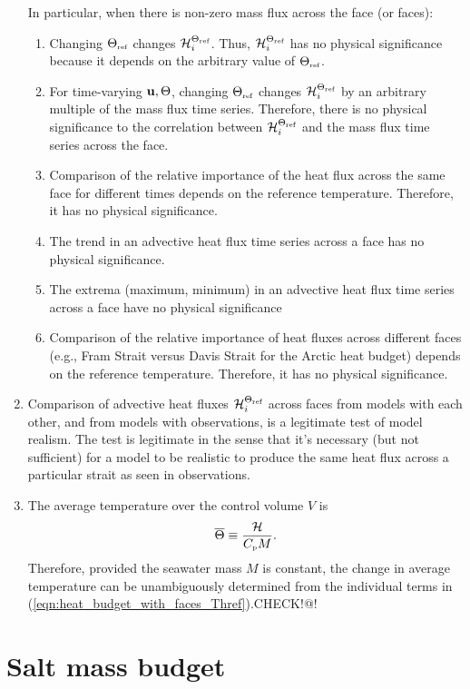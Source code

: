 \documentclass[10pt]{amsart}
\newcommand{\Cp}{C_{\mbox{\tiny p}}}
\newcommand{\Thref}{\Theta_{\mbox{\tiny ref}}}
\newcommand{\Heat}{{\mathcal H}^{\Thref}}
\begin{document}
\begin{enumerate}
In particular, when there is non-zero mass flux across the face (or faces):
\begin{enumerate}
\item Changing $\Thref$ changes $\Heat_i$. 
Thus, $\Heat_i$ has no physical significance because it depends on the arbitrary value of $\Thref$.
\item For time-varying ${\bf u}, \Theta$, changing $\Thref$ changes $\Heat_i$ by an arbitrary multiple of the mass flux time series. Therefore, there is no physical significance to the correlation between $\Heat_i$ and the mass flux time series across the face.
\item Comparison of the relative importance of the heat flux across the same face for different times depends on the reference temperature. Therefore, it has no physical significance. 
\item The trend in an advective heat flux time series across a face has no physical significance. 
\item The extrema (maximum, minimum) in an advective heat flux time series across a face have no physical significance
\item Comparison of the relative importance of heat fluxes across different faces (e.g., Fram Strait versus Davis Strait for the Arctic heat budget) depends on the reference temperature. Therefore, it has no physical significance.
\end{enumerate}
\item Comparison of advective heat fluxes $\Heat_i$ across faces from models with each other, and from models with observations, is a legitimate test of model realism. The test is legitimate in the sense that it's necessary (but not sufficient) for a model to be realistic to produce the same heat flux across a particular strait as seen in observations. 
\item The average temperature over the control volume $V$ is
\begin{align}
\overline{\Theta} \equiv \frac{{\mathcal H}}{\Cp M} . \nonumber
\end{align}
Therefore, provided the seawater mass $M$ is constant, the change in average temperature can be unambiguously determined from the individual terms in (\ref{eqn:heat_budget_with_faces_Thref}).CHECK!@!

\end{enumerate}

\section{Salt mass budget}
\label{sect:salt}
\end{document}
